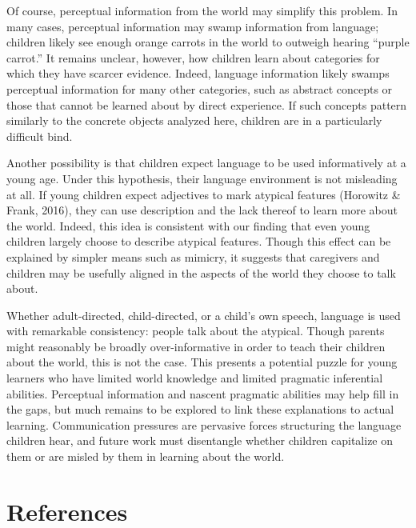 \documentclass[10pt, letterpaper]{article}
\begin{document}
Of course, perceptual information from the world may simplify this
problem. In many cases, perceptual information may swamp information
from language; children likely see enough orange carrots in the world to
outweigh hearing ``purple carrot.'' It remains unclear, however, how
children learn about categories for which they have scarcer evidence.
Indeed, language information likely swamps perceptual information for
many other categories, such as abstract concepts or those that cannot be
learned about by direct experience. If such concepts pattern similarly
to the concrete objects analyzed here, children are in a particularly
difficult bind.

Another possibility is that children expect language to be used
informatively at a young age. Under this hypothesis, their language
environment is not misleading at all. If young children expect
adjectives to mark atypical features (Horowitz \& Frank, 2016), they can
use description and the lack thereof to learn more about the world.
Indeed, this idea is consistent with our finding that even young
children largely choose to describe atypical features. Though this
effect can be explained by simpler means such as mimicry, it suggests
that caregivers and children may be usefully aligned in the aspects of
the world they choose to talk about.

Whether adult-directed, child-directed, or a child's own speech,
language is used with remarkable consistency: people talk about the
atypical. Though parents might reasonably be broadly over-informative in
order to teach their children about the world, this is not the case.
This presents a potential puzzle for young learners who have limited
world knowledge and limited pragmatic inferential abilities. Perceptual
information and nascent pragmatic abilities may help fill in the gaps,
but much remains to be explored to link these explanations to actual
learning. Communication pressures are pervasive forces structuring the
language children hear, and future work must disentangle whether
children capitalize on them or are misled by them in learning about the
world.

\hypertarget{references}{%
\section{References}\label{references}}

\setlength{\parindent}{-0.1in} 
\setlength{\leftskip}{0.125in}

\noindent
\end{document}
